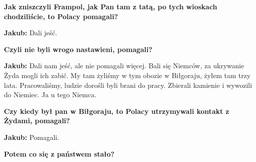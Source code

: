 \textbf{Jak zniszczyli Frampol, jak Pan tam z tatą, po tych wioskach chodziliście, to Polacy pomagali?} 

\textbf{Jakub:} Dali jeść. 

\textbf{Czyli nie byli wrogo nastawieni, pomagali?} 

\textbf{Jakub:} Dali nam jeść, ale nie pomagali więcej. Bali się Niemców, za ukrywanie Żyda mogli ich zabić. My tam żyliśmy w tym obozie w Biłgoraju, żyłem tam trzy lata. Pracowaliśmy, ludzie dorośli byli brani do pracy. Zbierali kamienie i wywozili do Niemiec. Ja u tego Niemca. 

\textbf{Czy kiedy był pan w Biłgoraju, to Polacy utrzymywali kontakt z Żydami, pomagali?} 

\textbf{Jakub:} Pomagali. 

\textbf{Potem co się z państwem stało?}

